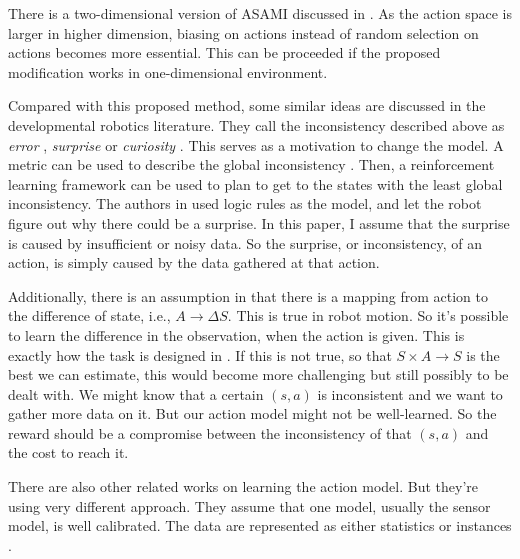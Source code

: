 \documentclass[10pt]{article}
\begin{document}
There is a two-dimensional version of ASAMI discussed in
\cite{ICRA08-stronger}.  As the action space is larger in higher
dimension, biasing on actions instead of random selection on actions
becomes more essential. This can be proceeded if the proposed
modification works in one-dimensional environment.

Compared with this proposed method, some similar ideas are discussed
in the developmental robotics literature. They call the inconsistency
described above as \textit{error} \cite{oudeyer2006discovering},
\textit{surprise} \cite{ranasinghe2008surprise} or \textit{curiosity}
\cite{schmidhuber2006developmental}. This serves as a motivation to
change the model. A metric can be used to describe the global
inconsistency \cite{oudeyer2006discovering}. Then, a reinforcement
learning framework can be used to plan to get to the states with the
least global inconsistency. The authors in
\cite{ranasinghe2008surprise} used logic rules as the model, and let
the robot figure out why there could be a surprise. In this paper, I
assume that the surprise is caused by insufficient or noisy data. So
the surprise, or inconsistency, of an action, is simply caused by the
data gathered at that action.

Additionally, there is an assumption in \cite{CSJ06} that there is a
mapping from action to the difference of state, i.e., $A \rightarrow
\Delta S$.  This is true in robot motion. So it's possible to learn
the difference in the observation, when the action is given. This is
exactly how the task is designed in \cite{ICDL10-hester}. If this is
not true, so that $S \times A \rightarrow S$ is the best we can
estimate, this would become more challenging but still possibly to be
dealt with. We might know that a certain $(s, a)$ is inconsistent and
we want to gather more data on it. But our action model might not be
well-learned. So the reward should be a compromise between the
inconsistency of that $(s, a)$ and the cost to reach it.

There are also other related works on learning the action model. But
they're using very different approach. They assume that one model,
usually the sensor model, is well calibrated. The data are represented
as either statistics \cite{And_learningand} or instances
\cite{LNAI2007-ahmadi}.




\end{document}
